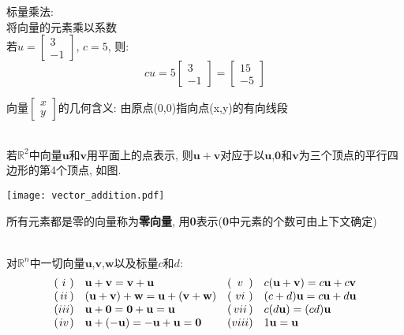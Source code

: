 标量乘法:\\
将向量的元素乘以系数\\
\indent 若$u=\left[\begin{array}{c}3\\-1\end{array}\right]$, $c=5$, 则:
\[cu=5\left[\begin{array}{c}3\\-1\end{array}\right]=\left[\begin{array}{c}15\\-5\end{array}\right]\]

向量$\left[\begin{array}{r}x\\y\end{array}\right]$的几何含义: 由原点(0,0)指向点(x,y)的有向线段\\[2ex]

\begin{law}[向量加法的平行四边形法则]\ \\
若$\mathbb{R}^2$中向量$\mathbf{u}$和$\mathbf{v}$用平面上的点表示, 则$\mathbf{u+v}$对应于以$\mathbf{u}$,$\mathbf{0}$和$\mathbf{v}$为三个顶点的平行四边形的第4个顶点, 如图.\\[2ex]
\begin{center}
\texttt{[image: vector\_addition.pdf]}
\end{center}
\end{law}\vspace{3ex}

所有元素都是零的向量称为\textbf{零向量}, 用\textbf{0}表示(\textbf{0}中元素的个数可由上下文确定)\\[2ex]

\begin{law}\ \\
对$\mathbb{R}^n$中一切向量$\mathbf{u}$,$\mathbf{v}$,$\mathbf{w}$以及标量$c$和$d$:
\begin{equation*}
\begin{array}{l@{}c@{}l l l@{}c@{}l l}
( & i & ) & \mathbf{u}+\mathbf{v}=\mathbf{v}+\mathbf{u} & ( & v & ) & c(\mathbf{u}+\mathbf{v})=c\mathbf{u}+c\mathbf{v}\\
( & ii & ) & (\mathbf{u}+\mathbf{v})+\mathbf{w}=\mathbf{u}+(\mathbf{v}+\mathbf{w}) & ( & vi & ) & (c+d)\mathbf{u}=c\mathbf{u}+d\mathbf{u}\\
( & iii & ) & \mathbf{u}+\mathbf{0}=\mathbf{0}+\mathbf{u}=\mathbf{u} & ( & vii & ) & c(d\mathbf{u})=(cd)\mathbf{u}\\
( & iv & ) & \mathbf{u}+(-\mathbf{u})=-\mathbf{u}+\mathbf{u}=\mathbf{0} & ( & viii & ) & 1\mathbf{u}=\mathbf{u}
\end{array}
\end{equation*}
\end{law}\vspace{2ex}

